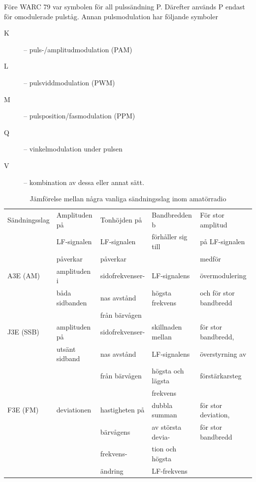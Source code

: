 Före WARC 79 var symbolen för all pulssändning P. Därefter används P endast för
omodulerade pulståg. Annan pulsmodulation har följande symboler

\begin{description}
\item[K] -- puls-/amplitudmodulation (PAM)
\item[L] -- pulsviddmodulation (PWM)
\item[M] -- pulsposition/fasmodulation (PPM)
\item[Q] -- vinkelmodulation under pulsen
\item[V] -- kombination av dessa eller annat sätt.
\end{description}

\begin{table}[h]
\begin{center}
\begin{tabular}{|l|l|l|l|l|}
\hline
Sändningsslag & Amplituden på & Tonhöjden på & Bandbredden b      & För stor amplitud \\
              & LF-signalen   & LF-signalen  & förhåller sig till & på LF-signalen \\
              & påverkar      & påverkar     &                    & medför \\ \hline
A3E (AM) & amplituden i   & sidofrekvenser- & LF-signalens    & övermodulering \\
         & båda sidbanden & nas avstånd    & högsta frekvens & och för stor bandbredd \\
         &                & från bärvågen  & & \\
J3E (SSB)& amplituden på  & sidofrekvenser- & skillnaden mellan & för stor bandbredd,\\
         & utsänt sidband & nas avstånd    & LF-signalens      & överstyrning av\\
         &                & från bärvågen  & högsta och lägsta & förstärkarsteg\\
         &                &                & frekvens          & \\
F3E (FM) & deviationen    & hastigheten på & dubbla summan     & för stor deviation,\\
         &                & bärvågens      & av största devia- & för stor bandbredd\\
         &                & frekvens-      & tion och högsta   & \\
         &                & ändring        & LF-frekvens       & \\ \hline
\end{tabular}
\end{center}
\caption{Jämförelse mellan några vanliga sändningsslag inom amatörradio}
\end{table}

